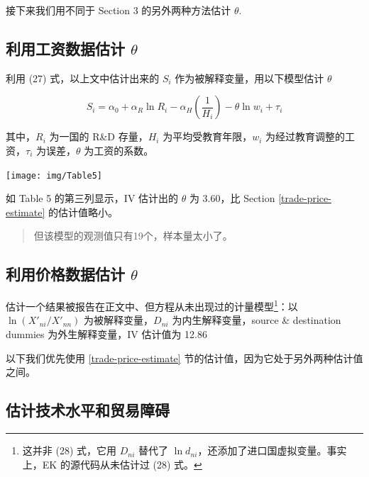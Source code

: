 \documentclass[
]{article}
\begin{document}
接下来我们用不同于 Section 3 的另外两种方法估计 \(\theta\).

\hypertarget{wage-estimate}{%
\subsection{\texorpdfstring{利用工资数据估计 \(\theta\)}{利用工资数据估计 \textbackslash theta}}\label{wage-estimate}}

利用 (27) 式，以上文中估计出来的 \(S_i\) 作为被解释变量，用以下模型估计
\(\theta\)

\[
S_{i}=\alpha_{0}+\alpha_{R} \ln R_{i}-\alpha_{H}\left(\frac{1}{H_{i}}\right)-\theta \ln w_{i}+\tau_{i}
\]

其中，\(R_i\) 为一国的 R\&D 存量，\(H_i\) 为平均受教育年限，\(w_i\)
为经过教育调整的工资，\(\tau_i\) 为误差，\(\theta\) 为工资的系数。

\begin{center}\texttt{[image: img/Table5]} \end{center}

如 Table 5 的第三列显示，IV 估计出的 \(\theta\) 为 3.60，比 Section \ref{trade-price-estimate} 的估计值略小。

\begin{quote}
但该模型的观测值只有19个，样本量太小了。
\end{quote}

\hypertarget{price-estimate}{%
\subsection{\texorpdfstring{利用价格数据估计 \(\theta\)}{利用价格数据估计 \textbackslash theta}}\label{price-estimate}}

估计一个结果被报告在正文中、但方程从未出现过的计量模型\footnote{这并非 (28) 式，它用 \(D_{ni}\) 替代了 \(\ln d_{ni}\)，还添加了进口国虚拟变量。事实上，EK 的源代码从未估计过 (28) 式。}：以 \(\ln (X'_{ni}/X'_{nn})\) 为被解释变量，\(D_{ni}\) 为内生解释变量，source \& destination dummies 为外生解释变量，IV 估计值为 12.86

以下我们优先使用 \ref{trade-price-estimate} 节的估计值，因为它处于另外两种估计值之间。

\hypertarget{ux4f30ux8ba1ux6280ux672fux6c34ux5e73ux548cux8d38ux6613ux969cux788d}{%
\subsection{估计技术水平和贸易障碍}\label{ux4f30ux8ba1ux6280ux672fux6c34ux5e73ux548cux8d38ux6613ux969cux788d}}
\end{document}
